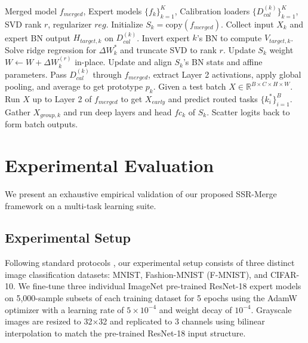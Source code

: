 \documentclass{article}
\theoremstyle{plain}
\theoremstyle{definition}
\theoremstyle{remark}
\begin{document}
\begin{algorithm}[H]
\caption{SSR-Merge Sequential Calibration and Dynamic Inference}
\label{alg:ssr_merge}
\begin{algorithmic}[1]
 Merged model $f_{merged}$, Expert models $\{f_k\}_{k=1}^K$, Calibration loaders $\{D_{cal}^{(k)}\}_{k=1}^K$, SVD rank $r$, regularizer $reg$.
\STATE Initialize $S_k = \text{copy}(f_{merged})$.
\STATE Collect input $X_k$ and expert BN output $H_{target,k}$ on $D_{cal}^{(k)}$.
\STATE Invert expert $k$'s BN to compute $V_{target,k}$.
\STATE Solve ridge regression for $\Delta W^*_k$ and truncate SVD to rank $r$.
\STATE Update $S_{k}$ weight $W \leftarrow W + \Delta W^{(r)}_k$ in-place.
\STATE Update and align $S_k$'s BN stats and affine parameters.
\ENDIF
\ENDFOR
\ENDFOR
{}
\STATE Pass $D_{cal}^{(k)}$ through $f_{merged}$, extract Layer 2 activations, apply global pooling, and average to get prototype $p_k$.
\ENDFOR
{}
\STATE Given a test batch $X \in \mathbb{R}^{B \times C \times H \times W}$.
\STATE Run $X$ up to Layer 2 of $f_{merged}$ to get $X_{early}$ and predict routed tasks $\{k^*_i\}_{i=1}^B$.
\STATE Gather $X_{group,k}$ and run deep layers and head $fc_k$ of $S_k$.
\ENDFOR
\STATE Scatter logits back to form batch outputs.
\end{algorithmic}
\end{algorithm}

\section{Experimental Evaluation}
\label{submission:exp}

We present an exhaustive empirical validation of our proposed SSR-Merge framework on a multi-task learning suite.

\subsection{Experimental Setup}
Following standard protocols \cite{slrwbc2026, wrsa2026, mspr2026}, our experimental setup consists of three distinct image classification datasets: MNIST, Fashion-MNIST (F-MNIST), and CIFAR-10. We fine-tune three individual ImageNet pre-trained ResNet-18 expert models on 5,000-sample subsets of each training dataset for 5 epochs using the AdamW optimizer with a learning rate of $5 \times 10^{-4}$ and weight decay of $10^{-4}$. Grayscale images are resized to 32$\times$32 and replicated to 3 channels using bilinear interpolation to match the pre-trained ResNet-18 input structure.
\end{document}
